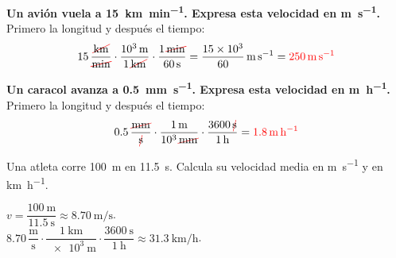 \begin{example}
    \textbf{Un avión vuela a \qty{15}{\km\per\minute}. Expresa esta velocidad en \unit{\m\per\s}.} Primero la longitud y después el tiempo:
    \begin{equation*}
        \num{15}\,\dfrac{\cancelunit{\km}}{\cancelunit{\minute}} \cdot \dfrac{\qty{e3}{\m}}{1\,\cancelunit{\km}} \cdot \dfrac{1\,\cancelunit{\minute}}{\qty{60}{\s}} = \dfrac{\num{15e3}}{60}\,\unit{\m\per\s} = \textcolor{red}{\qty{250}{\m\per\s}}
    \end{equation*}
\end{example}

\begin{example}
    \textbf{Un caracol avanza a \qty{0.5}{\mm\per\s}. Expresa esta velocidad en \unit{\m\per\hour}.} Primero la longitud y después el tiempo:
    \begin{equation*}
        \num{0.5}\,\dfrac{\cancelunit{\mm}}{\cancelunit{\s}} \cdot \dfrac{\qty{1}{\m}}{\num{e3}\,\cancelunit{\mm}} \cdot \dfrac{\num{3600}\,\cancelunit{\s}}{\qty{1}{\hour}} = \textcolor{red}{\qty{1.8}{\m\per\hour}}
    \end{equation*}
\end{example}

\begin{exercise}
    Una atleta corre \qty{100}{\metre} en \qty{11.5}{\s}. Calcula su velocidad media en \unit{\m\per\s} y en \unit{\km\per\hour}.
    \begin{solu}
        \(v = \dfrac{\qty{100}{\m}}{\qty{11.5}{\s}} \approx \qty{8.70}{\m\per\s}\). \\
        \(\num{8.70}\,\dfrac{\unit{\m}}{\unit{\s}} \cdot \dfrac{\qty{1}{\km}}{\qty{e3}{\m}} \cdot \dfrac{\qty{3600}{\s}}{\qty{1}{\hour}} \approx \qty{31.3}{\km\per\hour}\).
    \end{solu}
\end{exercise}

